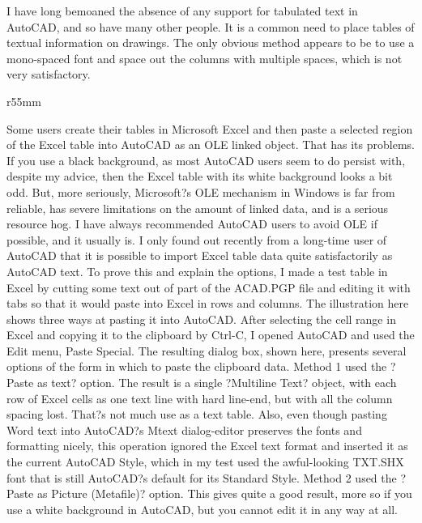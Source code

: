 \documentclass[a4paper]{article}
\newcommand\partone[1]{{   \fontspec{ELPHIN.TTF} \fontsize{6}{12} \selectfont #1}}
\begin{document}
\partone{
I have long bemoaned the absence of any support for tabulated text in AutoCAD, and so have many other people. It is a common need to place tables of textual information on drawings. The only obvious method appears to be to use a mono-spaced font and space out the columns with multiple spaces, which is not very satisfactory.


\begin{wrapfigure}{r}{55mm}
    \resizebox{55mm}{151mm}{%
        \begin{tikzpicture}
            \fill[pattern color=blue,pattern=north east lines] (0,0) rectangle (55,151);
        \end{tikzpicture}
    }
\end{wrapfigure}


Some users create their tables in Microsoft Excel and then paste a selected region of the Excel table into AutoCAD as an OLE linked object. That has its problems. If you use a black background, as most AutoCAD users seem to do persist with, despite my advice, then the Excel table with its white background looks a bit odd. But, more seriously, Microsoft?s OLE mechanism in Windows is far from reliable, has severe limitations on the amount of linked data, and is a serious resource hog. I have always recommended AutoCAD users to avoid OLE if possible, and it usually is.
I only found out recently from a long-time user of AutoCAD that it is possible to import Excel table data quite satisfactorily as AutoCAD text. To prove this and explain the options, I made a test table in Excel by cutting some text out of part of the ACAD.PGP file and editing it with tabs so that it would paste into Excel in rows and columns. The illustration here shows three ways at pasting it into AutoCAD. After selecting the cell range in Excel and copying it to the clipboard by Ctrl-C, I opened AutoCAD and used the Edit menu, Paste Special. The resulting dialog box, shown here, presents several options of the form in which to paste the clipboard data.
Method 1 used the ?Paste as text? option. The result is a single ?Multiline Text? object, with each row of Excel cells as one text line with hard line-end, but with all the column spacing lost. That?s not much use as a text table. Also, even though pasting Word text into AutoCAD?s Mtext dialog-editor preserves the fonts and formatting nicely, this operation ignored the Excel text format and inserted it as the current AutoCAD Style, which in my test used the awful-looking TXT.SHX font that is still AutoCAD?s default for its Standard Style.
Method 2 used the ?Paste as Picture (Metafile)? option. This gives quite a good result, more so if you use a white background in AutoCAD, but you cannot edit it in any way at all. 
}
\end{document}
